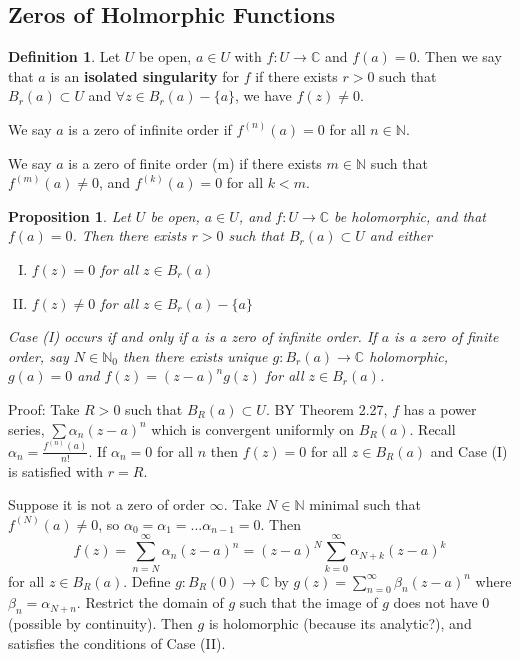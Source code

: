 \documentclass[11pt]{article}
\theoremstyle{plain}
\newtheorem{proposition}[theorem]{Proposition}
\theoremstyle{definition}
\newtheorem{definition}[theorem]{Definition}
\newcommand{\C}{\mathbb{C}}
\begin{document}
\subsection{Zeros of Holmorphic Functions}
\begin{definition}
Let $U$ be open, $a \in U$ with $f: U \to \C$ and $f(a) = 0$. Then we say that $a$ is an \textbf{isolated singularity} for $f$ if there exists $r>0$ such that $B_r(a)\subset U$ and $\forall z \in B_r(a) - \{ a\}$, we have $f(z) \neq 0$.

We say $a$ is a zero of infinite order if $f^{(n)}(a) = 0$ for all $n \in \mathbb{N}$.

We say $a$ is a zero of finite order (m) if there exists $m \in \mathbb{N}$ such that $f^{(m)}(a) \neq 0$, and $f^{(k)}(a) = 0$ for all $k < m$.
\end{definition}

\begin{proposition} 
Let $U$ be open, $a\in U$, and $f:U\to\C$ be holomorphic, and that $f(a) = 0$. Then there exists $r > 0$ such that $B_r(a) \subset U$ and either 
\begin{enumerate}[(I)]
\item $f(z) = 0$ for all $z \in B_r(a)$
\item $f(z) \neq 0$ for all $z \in B_r(a) - \{a\}$
\end{enumerate}
Case (I) occurs if and only if $a$ is a zero of infinite order. If $a$ is a zero of finite order, say $N \in \mathbb{N}_0$ then there exists unique $g: B_r(a) \to \C$ holomorphic, $g(a) = 0$ and $f(z) = (z-a)^ng(z)$ for all $z \in B_r(a)$.
\end{proposition}

Proof: Take $R > 0$ such that $B_R(a) \subset U$. BY Theorem 2.27, $f$ has a power series, $\sum \alpha_n (z- a)^n$ which is convergent uniformly on $B_R(a)$. Recall $\alpha_n = \frac{f^{(n)}(a)}{n!}$. If $\alpha_n = 0$ for all $n$ then $f(z) = 0$ for all $z \in B_R(a)$ and Case (I) is satisfied with $r = R$.

Suppose it is not a zero of order $\infty$. Take $N \in \mathbb{N}$ minimal such that $f^{(N)}(a) \neq 0$, so $\alpha_0 = \alpha_1 = ... \alpha_{n-1} = 0$. Then 
$$ f(z) = \sum_{n=N}^\infty \alpha_n(z-a)^n = (z-a)^N\sum_{k=0}^{\infty}\alpha_{N+k}(z-a)^k $$
for all $z \in B_R(a)$. Define $g:B_R(0)\to\C$ by $g(z) = \sum_{n=0}^{\infty} \beta_n(z-a)^n$ where $\beta_n = \alpha_{N + n}$. Restrict the domain of $g$ such that the image of $g$ does not have $0$ (possible by continuity). Then $g$ is holomorphic (because its analytic?), and satisfies the conditions of Case (II).
\end{document}
